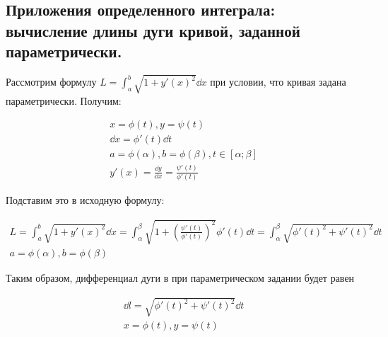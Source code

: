 \subsection{%
  Приложения определенного интеграла: вычисление длины дуги кривой, заданной
  параметрически.%
}

Рассмотрим формулу \(L = \int_{a}^{b} \sqrt{1 + y'(x)^2} \dd x\) при условии,
что кривая задана параметрически. Получим:

\begin{align*}
  x = \phi(t), y = \psi(t) \\
  \dd x = \phi'(t) \dd t \\
  a = \phi(\alpha), b = \phi(\beta), t \in [\alpha; \beta] \\
  y'(x) = \frac{\dd y}{\dd x} = \frac{\psi'(t)}{\phi'(t)}
\end{align*}

Подставим это в исходную формулу:

\begin{align*}
  L
  = \int_{a}^{b} \sqrt{1 + y'(x)^2} \dd x
  = \int_{\alpha}^{\beta}
    \sqrt{1 + \left(\frac{\psi'(t)}{\phi'(t)}\right)^2} \phi'(t) \dd t
  = \int_{\alpha}^{\beta} \sqrt{\phi'(t)^2 + \psi'(t)^2} \dd t \\
  a = \phi(\alpha), b = \phi(\beta)
\end{align*}

\begin{remark}\label{arc-diff-param}
  Таким образом, дифференциал дуги в при параметрическом задании будет равен
  
  \begin{align*}
    \dd l = \sqrt{\phi'(t)^2 + \psi'(t)^2} \dd t \\
    x = \phi(t), y = \psi(t) \\
  \end{align*}
\end{remark}
